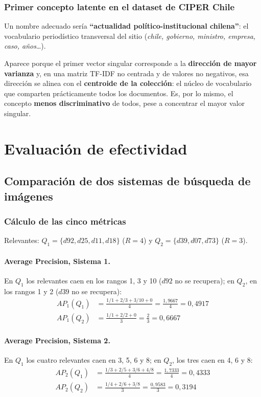 \documentclass[11pt, a4paper]{article}
\begin{document}
\subsubsection{Primer concepto latente en el dataset de CIPER Chile}

Un nombre adecuado sería \textbf{``actualidad político-institucional chilena''}: el vocabulario
periodístico transversal del sitio (\textit{chile, gobierno, ministro, empresa, caso, años}\dots).

Aparece porque el primer vector singular corresponde a la \textbf{dirección de mayor varianza} y, en
una matriz TF-IDF no centrada y de valores no negativos, esa dirección se alinea con el
\textbf{centroide de la colección}: el núcleo de vocabulario que comparten prácticamente todos los
documentos. Es, por lo mismo, el concepto \textbf{menos discriminativo} de todos, pese a concentrar
el mayor valor singular.

\section{Evaluación de efectividad}

\subsection{Comparación de dos sistemas de búsqueda de imágenes}

\subsubsection{Cálculo de las cinco métricas}

Relevantes: $Q_1 = \{d92, d25, d11, d18\}$ ($R=4$) y $Q_2 = \{d39, d07, d73\}$ ($R=3$).

\paragraph{Average Precision, Sistema 1.} En $Q_1$ los relevantes caen en los rangos 1, 3 y 10
($d92$ no se recupera); en $Q_2$, en los rangos 1 y 2 ($d39$ no se recupera):
\begin{align}
AP_{1}(Q_1) &= \frac{1/1 + 2/3 + 3/10 + 0}{4} = \frac{1{,}9667}{4} = 0{,}4917 \\
AP_{1}(Q_2) &= \frac{1/1 + 2/2 + 0}{3} = \frac{2}{3} = 0{,}6667
\end{align}

\paragraph{Average Precision, Sistema 2.} En $Q_1$ los cuatro relevantes caen en 3, 5, 6 y 8; en
$Q_2$, los tres caen en 4, 6 y 8:
\begin{align}
AP_{2}(Q_1) &= \frac{1/3 + 2/5 + 3/6 + 4/8}{4} = \frac{1{,}7333}{4} = 0{,}4333 \\
AP_{2}(Q_2) &= \frac{1/4 + 2/6 + 3/8}{3} = \frac{0{,}9583}{3} = 0{,}3194
\end{align}
\end{document}
